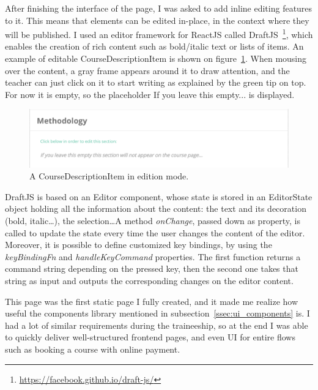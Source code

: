 After finishing the interface of the page, I was asked to add inline editing features to it. This means that elements can be edited in-place, in the context where they will be published. I used an editor framework for ReactJS called DraftJS~\footnote{\url{https://facebook.github.io/draft-js/}}, which enables the creation of rich content such as bold/italic text or lists of items. An example of editable \guillemotleft{} CourseDescriptionItem \guillemotright{} is shown on {\sc figure}~\ref{fig:courseEdit}. When mousing over the content, a gray frame appears around it to draw attention, and the teacher can just click on it to start writing as explained by the green tip on top. For now it is empty, so the placeholder \guillemotleft{} If you leave this empty... \guillemotright{} is displayed.

\begin{figure}[H]
    \centering
    \includegraphics[scale=0.4]{figure/courseEdit.png}
    \caption{A \guillemotleft{} CourseDescriptionItem \guillemotright{} in edition mode.}
    \label{fig:courseEdit}
\end{figure}

DraftJS is based on an \guillemotleft{} Editor \guillemotright{} component, whose state is stored in an \guillemotleft{} EditorState \guillemotright{} object holding all the information about the content: the text and its decoration (bold, italic\ldots), the selection\ldots A method \textit{onChange}, passed down as property, is called to update the state every time the user changes the content of the editor. Moreover, it is possible to define customized key bindings, by using the \textit{keyBindingFn} and \textit{handleKeyCommand} properties. The first function returns a command string depending on the pressed key, then the second one takes that string as input and outputs the corresponding changes on the editor content.

This page was the first static page I fully created, and it made me realize how useful the components library mentioned in {\sc subsection}~\ref{ssec:ui_components} is. I had a lot of similar requirements during the traineeship, so at the end I was able to quickly deliver well-structured frontend pages, and even UI for entire flows such as booking a course with online payment.

